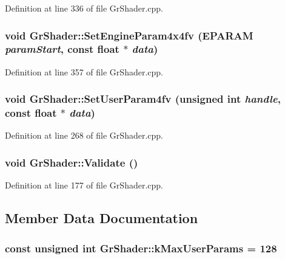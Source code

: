 \begin{CompactItemize}
Definition at line 336 of file GrShader.cpp.\hypertarget{class_gr_shader_c054492b117be764f4fd2440b7bd1020}{
\subsubsection[{SetEngineParam4x4fv}]{\setlength{\rightskip}{0pt plus 5cm}void GrShader::SetEngineParam4x4fv ({\bf EPARAM} {\em paramStart}, \/  const float $\ast$ {\em data})}}
\label{class_gr_shader_c054492b117be764f4fd2440b7bd1020}




Definition at line 357 of file GrShader.cpp.\hypertarget{class_gr_shader_8521f7e58ccb0116d07e2c501ae06f87}{
\subsubsection[{SetUserParam4fv}]{\setlength{\rightskip}{0pt plus 5cm}void GrShader::SetUserParam4fv (unsigned int {\em handle}, \/  const float $\ast$ {\em data})}}
\label{class_gr_shader_8521f7e58ccb0116d07e2c501ae06f87}




Definition at line 268 of file GrShader.cpp.\hypertarget{class_gr_shader_420e8f1956844878d2a8aeb09f0ab888}{
\subsubsection[{Validate}]{\setlength{\rightskip}{0pt plus 5cm}void GrShader::Validate ()}}
\label{class_gr_shader_420e8f1956844878d2a8aeb09f0ab888}




Definition at line 177 of file GrShader.cpp.

\subsection{Member Data Documentation}
\hypertarget{class_gr_shader_32d823afd380bcdf283ed2e667cf66cb}{
\subsubsection[{kMaxUserParams}]{\setlength{\rightskip}{0pt plus 5cm}const unsigned int {\bf GrShader::kMaxUserParams} = 128}}
\label{class_gr_shader_32d823afd380bcdf283ed2e667cf66cb}





\end{CompactItemize}
